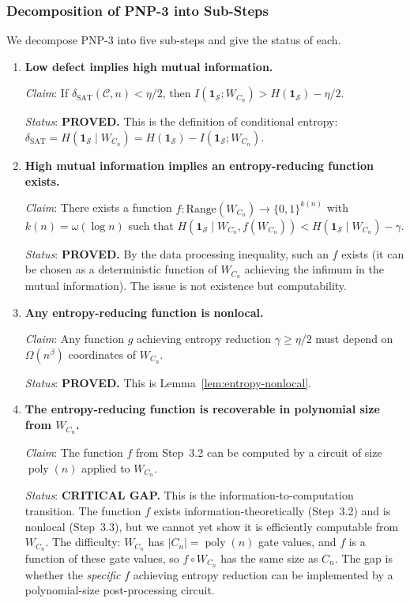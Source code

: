 \documentclass[11pt]{article}
\theoremstyle{definition}
\theoremstyle{remark}
\DeclareMathOperator{\poly}{poly}
\newcommand{\calC}{\mathcal{C}}
\newcommand{\calS}{\mathcal{S}}
\newcommand{\dSAT}{\delta_{\mathrm{SAT}}}
\begin{document}
\subsubsection{Decomposition of PNP-3 into Sub-Steps}

We decompose PNP-3 into five sub-steps and give the status of each.

\begin{enumerate}[label=\textbf{3.\arabic*},nosep,leftmargin=2em]
  \item \textbf{Low defect implies high mutual information.}

    \textit{Claim}: If $\dSAT(\calC, n) < \eta/2$, then
    $I(\mathbf{1}_\calS ; W_{C_n}) > H(\mathbf{1}_\calS) - \eta/2$.

    \textit{Status}: \textbf{PROVED.}  This is the definition of
    conditional entropy: $\dSAT = H(\mathbf{1}_\calS \mid W_{C_n})
    = H(\mathbf{1}_\calS) - I(\mathbf{1}_\calS ; W_{C_n})$.

  \item \textbf{High mutual information implies an entropy-reducing function
    exists.}

    \textit{Claim}: There exists a function $f: \mathrm{Range}(W_{C_n})
    \to \{0,1\}^{k(n)}$ with $k(n) = \omega(\log n)$ such that
    $H(\mathbf{1}_\calS \mid W_{C_n}, f(W_{C_n})) <
    H(\mathbf{1}_\calS \mid W_{C_n}) - \gamma$.

    \textit{Status}: \textbf{PROVED.}  By the data processing inequality,
    such an $f$ exists (it can be chosen as a deterministic function of
    $W_{C_n}$ achieving the infimum in the mutual information).  The issue
    is not existence but computability.

  \item \textbf{Any entropy-reducing function is nonlocal.}

    \textit{Claim}: Any function $g$ achieving entropy reduction
    $\gamma \geq \eta/2$ must depend on $\Omega(n^\beta)$ coordinates
    of $W_{C_n}$.

    \textit{Status}: \textbf{PROVED.}  This is
    Lemma~\ref{lem:entropy-nonlocal}.

  \item \textbf{The entropy-reducing function is recoverable in polynomial
    size from $W_{C_n}$.}

    \textit{Claim}: The function $f$ from Step~3.2 can be computed by a
    circuit of size $\poly(n)$ applied to $W_{C_n}$.

    \textit{Status}: \textbf{CRITICAL GAP.}  This is the
    information-to-computation transition.  The function $f$ exists
    information-theoretically (Step~3.2) and is nonlocal (Step~3.3),
    but we cannot yet show it is efficiently computable from $W_{C_n}$.
    The difficulty: $W_{C_n}$ has $|C_n| = \poly(n)$ gate values, and
    $f$ is a function of these gate values, so $f \circ W_{C_n}$ has
    the same size as $C_n$.  The gap is whether the \emph{specific} $f$
    achieving entropy reduction can be implemented by a polynomial-size
    post-processing circuit.


\end{enumerate}
\end{document}
